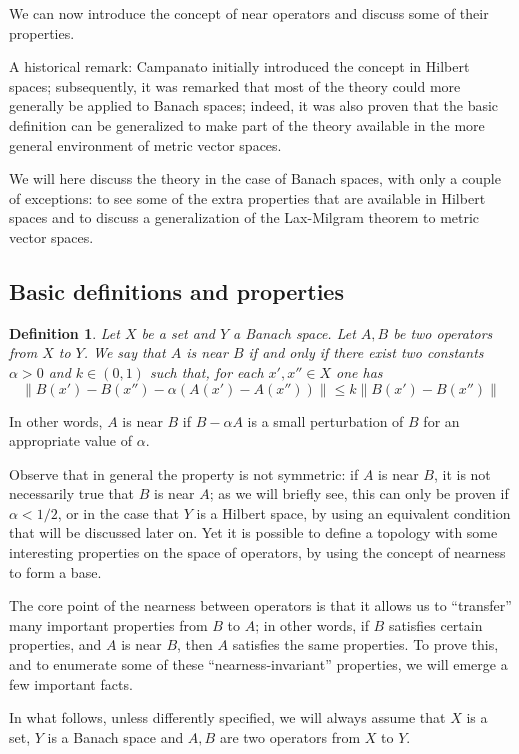 \documentclass[12pt]{article}
\theoremstyle{normale}
\theoremstyle{liscio}
\newtheorem{definition}[theorem]{Definition}
\providecommand{\norm}[1]{\lVert#1\rVert}
\begin{document}
We can now introduce the concept of near operators and discuss
some of their properties.

A historical remark: Campanato initially introduced the concept in
Hilbert spaces; subsequently, it was remarked that most of the
theory could more generally be applied to Banach spaces; indeed,
it was also proven that the basic definition can be generalized to
make part of the theory available in the more general environment
of metric vector spaces.

We will here discuss the theory in the case of Banach spaces,
with only a couple of exceptions: to see some of the extra
properties that are available in Hilbert spaces and to discuss
a generalization of the Lax-Milgram theorem to metric vector spaces.

\subsection{Basic definitions and properties}

\begin{definition}
Let $X$ be a set and $Y$ a Banach space. Let $A, B$ be two
operators from $X$ to $Y$. We say that $A$ is near $B$ if and only
if there exist two constants $\alpha > 0$ and $k \in (0, 1)$ such
that, for each $x', x'' \in X$ one has
\[
\norm{B(x') - B(x'') - \alpha ( A(x') - A(x'') ) } \leq
k \norm{B(x') - B(x'')}
\]
\end{definition}

In other words, $A$ is near $B$ if $B - \alpha A$ is a small
perturbation of $B$ for an appropriate value of $\alpha$.

Observe that in general the property is not symmetric: if $A$ is
near $B$, it is not necessarily true that $B$ is near $A$; as we
will briefly see, this can only be proven if $\alpha < 1/2$, or in
the case that $Y$ is a Hilbert space, by using an equivalent
condition that will be discussed later on. Yet it is possible to
define a topology with some interesting properties on the space of
operators, by using the concept of nearness to form a base.

The core point of the nearness between operators is that it allows
us to ``transfer'' many important properties from $B$ to $A$; in
other words, if $B$ satisfies certain properties, and $A$ is near
$B$, then $A$ satisfies the same properties. To prove this, and to
enumerate some of these ``nearness-invariant'' properties, we will
emerge a few important facts.

In what follows, unless differently specified, we will always
assume that $X$ is a set, $Y$ is a Banach space and $A, B$ are two
operators from $X$ to $Y$.
\end{document}
